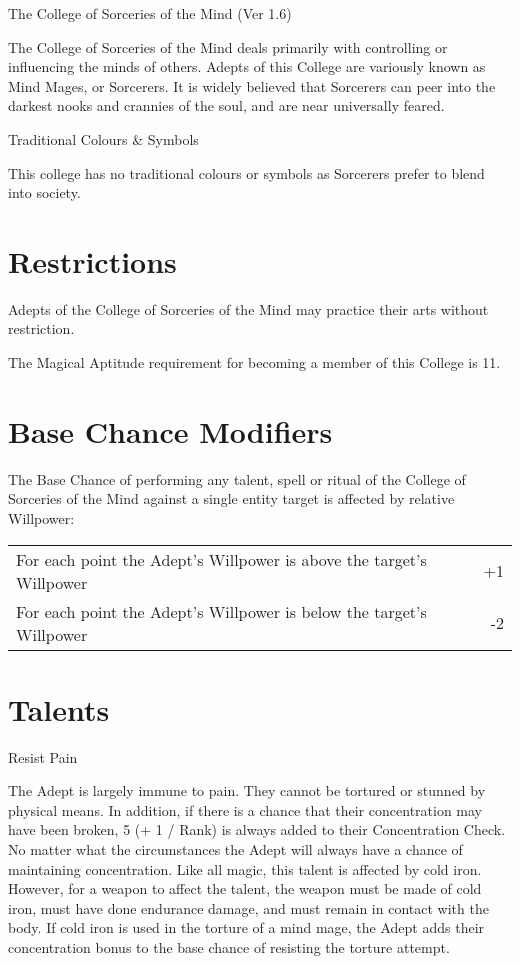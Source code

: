 \begin{Chapter}{The College of Sorceries of the Mind (Ver 1.6)}

The College of Sorceries of the Mind deals primarily with controlling
or influencing the minds of others. Adepts of this College are
variously known as Mind Mages, or Sorcerers. It is widely believed
that Sorcerers can peer into the darkest nooks and crannies of the
soul, and are near universally feared.

Traditional Colours \& Symbols  

This college has no traditional colours or symbols as Sorcerers prefer
to blend into society.

\section{Restrictions}

Adepts of the College of Sorceries of the Mind may practice their arts
without restriction.

The Magical Aptitude requirement for becoming a member of this College
is 11.

\section{Base Chance Modifiers}

The Base Chance of performing any talent, spell or ritual of the
College of Sorceries of the Mind against a single entity target is
affected by relative Willpower:

\begin{tabularx}{\columnwidth}{Xr}
For each point the Adept’s Willpower is above the target’s Willpower & +1 \\
For each point the Adept’s Willpower is below the target’s Willpower & -2 \\
\end{tabularx}

\section{Talents }

\begin{talent}[T-1]{Resist Pain}

\begin{effects}
The Adept is largely immune to pain. They cannot be tortured or
stunned by physical means.  In addition, if there is a chance that
their concentration may have been broken, 5 (+ 1 / Rank) is always
added to their Concentration Check.  No matter what the circumstances
the Adept will always have a chance of maintaining concentration.
Like all magic, this talent is affected by cold iron.  However, for a
weapon to affect the talent, the weapon must be made of cold iron,
must have done endurance damage, and must remain in contact with the
body. If cold iron is used in the torture of a mind mage, the Adept
adds their concentration bonus to the base chance of resisting the
torture attempt.
\end{effects}
\end{talent}


\end{Chapter}
